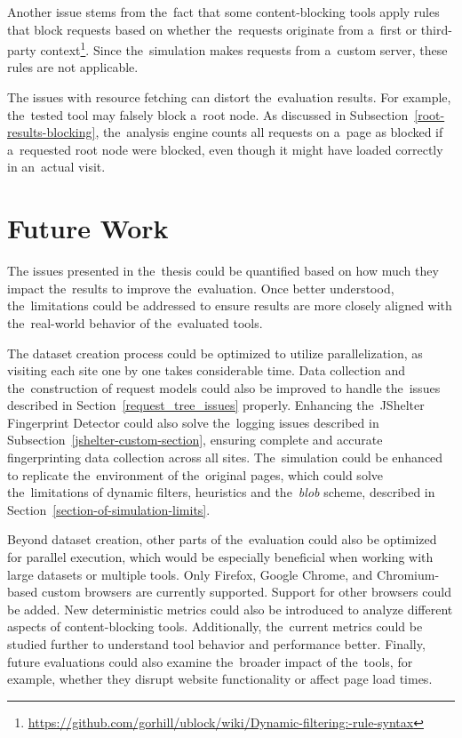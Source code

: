 Another issue stems from the~fact that some content-blocking tools apply rules that block requests based on whether the~requests originate from a~first or third-party context\footnote{\url{https://github.com/gorhill/ublock/wiki/Dynamic-filtering:-rule-syntax}}. Since the~simulation makes requests from a~custom server, these rules are not applicable. 

The issues with resource fetching can distort the~evaluation results. For example, the~tested tool may falsely block a~root node. As discussed in Subsection~\ref{root-results-blocking}, the~analysis engine counts all requests on a~page as blocked if a~requested root node were blocked, even though it might have loaded correctly in an~actual visit.


\section{Future Work}
The issues presented in the~thesis could be quantified based on how much they impact the~results to improve the~evaluation. Once better understood, the~limitations could be addressed to ensure results are more closely aligned with the~real-world behavior of the~evaluated tools. 

The dataset creation process could be optimized to utilize parallelization, as visiting each site one by one takes considerable time. Data collection and the~construction of request models could also be improved to handle the~issues described in Section~\ref{request_tree_issues} properly. Enhancing the~JShelter Fingerprint Detector could also solve the~logging issues described in Subsection~\ref{jshelter-custom-section}, ensuring complete and accurate fingerprinting data collection across all sites. The~simulation could be enhanced to replicate the~environment of the~original pages, which could solve the~limitations of dynamic filters, heuristics and the~\textit{blob} scheme, described in Section~\ref{section-of-simulation-limits}.

Beyond dataset creation, other parts of the~evaluation could also be optimized for parallel execution, which would be especially beneficial when working with large datasets or multiple tools. Only Firefox, Google Chrome, and Chromium-based custom browsers are currently supported. Support for other browsers could be added. New deterministic metrics could also be introduced to analyze different aspects of content-blocking tools. Additionally, the~current metrics could be studied further to understand tool behavior and performance better. Finally, future evaluations could also examine the~broader impact of the~tools, for example, whether they disrupt website functionality or affect page load times.
